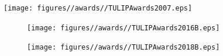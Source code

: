 \documentclass{tikzposter} %
\begin{document}
\begin{columns}
{\begin{minipage}{\linewidth}
\begin{multicols}{3}
				\begin{minipage}{\linewidth}
					\texttt{[image: figures//awards//TULIPAwards2007.eps]}
				\end{minipage}				
				
				\begin{minipage}{\linewidth}
				\begin{figure}[H]
					\begin{minipage}{\linewidth}
					\subfigure
					{
						\texttt{[image: figures//awards//TULIPAwards2016B.eps]}
					}
					\end{minipage}
				
					\begin{minipage}{\linewidth}
					\subfigure
					{
						\texttt{[image: figures//awards//TULIPAwards2018B.eps]}
					}
					\end{minipage}
				\end{figure}	
				\end{minipage}	
				\end{multicols}
			\end{minipage}
			
			
			

		}
		
		
		
		
		
	\end{columns}
	
	
	
\end{document}
